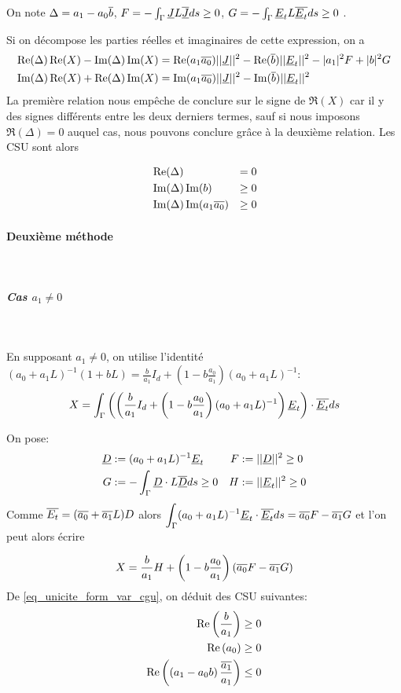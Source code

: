 On note $\Delta = a_1 -a_0{\overline{b}}$, $F = -\int_\Gamma \underline{J} L {\overline{\underline{J}}} ds \ge 0 $, $G = -\int_\Gamma \underline{E}_t L {\overline{\underline{E}_t}} ds \ge 0 $ . 

Si on décompose les parties réelles et imaginaires de cette expression, on a
\begin{align*}
\operatorname{Re}(\Delta)\operatorname{Re}(X) - \operatorname{Im}(\Delta)\operatorname{Im}(X) &= \operatorname{Re}(a_1{\overline{a_0}}) ||\underline{J}||^2 - \operatorname{Re}({\overline{b}})||\underline{E}_t||^2 -|a_1|^2 F + |b|^2 G \\
\operatorname{Im}(\Delta)\operatorname{Re}(X) + \operatorname{Re}(\Delta)\operatorname{Im}(X) &= \operatorname{Im}(a_1{\overline{a_0}}) ||\underline{J}||^2 - \operatorname{Im}({\overline{b}})||\underline{E}_t||^2
\end{align*}
La première relation nous empêche de conclure sur le signe de $\Re(X)$ car il y des signes différents entre les deux derniers termes, sauf si nous imposons $\Re( \Delta)= 0$ auquel cas, nous pouvons conclure grâce à la deuxième relation. Les CSU sont alors

\begin{align}
&\operatorname{Re}(\Delta) &= 0\\
&\operatorname{Im}(\Delta)\operatorname{Im}(b) &\ge 0\\
&\operatorname{Im}(\Delta)\operatorname{Im}(a_1{\overline{a_0}})&\ge 0
\end{align}

\paragraph{Deuxième méthode}
~
\subparagraph{Cas $a_1\not=0$}
~

En supposant $a_1 \not=0$, on utilise l'identité $(a_0 + a_1 L)^{-1}(1 + b L)  = \frac{b}{a_1} I_d + \left(1-b\frac{a_0}{a_1}\right)(a_0+a_1L)^{-1}$:
\[
X = \int_\Gamma \left(\left(\dfrac{b}{a_1} I_d + \left(1-b\dfrac{a_0}{a_1}\right)(a_0+a_1L)^{-1}\right)\underline{E}_t\right) \cdot {\overline{\underline{E}_t}} ds
\]

On pose:
\begin{align*}
\underline{D} &:= (a_0 + a_1 L)^{-1}\underline{E}_t & F&:= || \underline{D} || ^2 \ge 0  \\
G&:= -\int_\Gamma \underline{D} \cdot L{\overline{\underline{D}}} ds \ge 0 & H &:= || \underline{E}_t || ^2 \ge 0
\end{align*}
Comme ${\overline{E_t}} = ({\overline{a_0}} + {\overline{a_1}}L)D$ alors $\displaystyle\int_\Gamma (a_0 +a_1 L) ^{-1}\underline{E}_t\cdot {\overline{\underline{E}_t}} ds = {\overline{a_0}} F - {\overline{a_1}} G$ et l'on peut alors écrire

\begin{equation}
\label{eq_unicite_form_var_decomp_cgu_ci1_a1}
X = \dfrac{b}{a_1}H   + \left(1-b\dfrac{a_0}{a_1}\right)\left({\overline{a_0}} F - {\overline{a_1}} G\right)
\end{equation}
De \eqref{eq_unicite_form_var_cgu}, on déduit des CSU suivantes:
\begin{align}
\operatorname{Re}\left(\dfrac{b}{a_1}\right) \ge 0 \\
\operatorname{Re}\left(a_0\right) \ge 0 \\
\operatorname{Re}\left(\left(a_1-a_0 b\right)\dfrac{{\overline{a_1}}}{a_1}\right) \le 0
\end{align}


